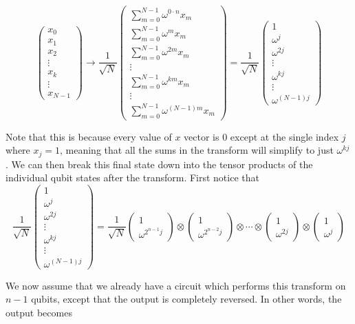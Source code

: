 \documentclass[11pt]{report}
\newcommand{\?}{\stackrel{?}{=}}
\newcommand{\qcol}[2]{\ensuremath{\begin{pmatrix} #1 \\ #2 \end{pmatrix}}}
\begin{document}
$$\begin{pmatrix}
	x_0 \\
	x_1 \\
	x_2 \\
	\vdots \\
    x_k \\
    \vdots \\
    x_{N-1}
  \end{pmatrix}
\to \frac{1}{\sqrt{N}}
  \begin{pmatrix}
	\sum_{m=0}^{N-1} \omega^{0\cdot n} x_m\\
	\sum_{m=0}^{N-1} \omega^{m} x_m \\
	\sum_{m=0}^{N-1} \omega^{2m} x_m \\
	\vdots \\
    \sum_{m=0}^{N-1} \omega^{km} x_m \\
    \vdots \\
    \sum_{m=0}^{N-1} \omega^{(N-1)m} x_m
  \end{pmatrix} = 
  \frac{1}{\sqrt{N}}
  \begin{pmatrix}
	1\\
	\omega^{j} \\
	\omega^{2j} \\
	\vdots \\
    \omega^{kj} \\
    \vdots \\
    \omega^{(N-1)j}
  \end{pmatrix}
$$

Note that this is because every value of $x$ vector is 0 except at the single index $j$ where $x_j = 1$, meaning that all the sums in the transform will simplify to just $\omega^{kj}$.
We can then break this final state down into the tensor products of the individual qubit states after the transform. First notice that 
$$\frac{1}{\sqrt{N}}
  \begin{pmatrix}
	1\\
	\omega^{j} \\
	\omega^{2j} \\
	\vdots \\
    \omega^{kj} \\
    \vdots \\
    \omega^{(N-1)j}
  \end{pmatrix} = 
  \frac{1}{\sqrt{N}}
  \qcol{1}{\omega^{2^{n-1}j}}
  \otimes
  \qcol{1}{\omega^{2^{n-2}j}}
  \otimes \cdots \otimes
  \qcol{1}{\omega^{2j}}
  \otimes
  \qcol{1}{\omega^{j}}
$$

We now assume that we already have a circuit which performs this transform on $n-1$ qubits, except that the output is completely reversed. In other words, the output becomes 
\end{document}

